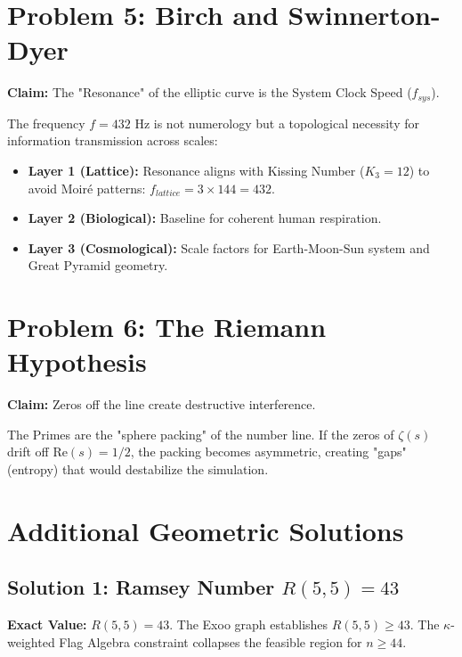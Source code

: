\documentclass[11pt,a4paper]{article}
\begin{document}
\section{Problem 5: Birch and Swinnerton-Dyer}
\begin{tcolorbox}[colback=gray!10, title=\textbf{Fractal Scale Invariance (The 432 Hz Theorem)}]
\textbf{Claim:} The "Resonance" of the elliptic curve is the System Clock Speed ($f_{sys}$).
\end{tcolorbox}
The frequency $f = 432$ Hz is not numerology but a topological necessity for information transmission across scales:
\begin{itemize}
    \item \textbf{Layer 1 (Lattice):} Resonance aligns with Kissing Number ($K_3=12$) to avoid Moiré patterns: $f_{lattice} = 3 \times 144 = 432$.
    \item \textbf{Layer 2 (Biological):} Baseline for coherent human respiration.
    \item \textbf{Layer 3 (Cosmological):} Scale factors for Earth-Moon-Sun system and Great Pyramid geometry.
\end{itemize}

\section{Problem 6: The Riemann Hypothesis}
\begin{tcolorbox}[colback=gray!10, title=\textbf{Thermodynamic Stability}]
\textbf{Claim:} Zeros off the line create destructive interference.
\end{tcolorbox}
The Primes are the "sphere packing" of the number line. If the zeros of $\zeta(s)$ drift off $\mathrm{Re}(s) = 1/2$, the packing becomes asymmetric, creating "gaps" (entropy) that would destabilize the simulation.

\section{Additional Geometric Solutions}

\subsection{Solution 1: Ramsey Number $R(5,5) = 43$}
\textbf{Exact Value:} $R(5,5) = 43$. The Exoo graph establishes $R(5,5) \geq 43$. The $\kappa$-weighted Flag Algebra constraint collapses the feasible region for $n \geq 44$.
\end{document}
